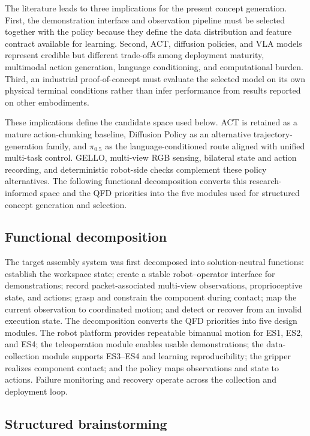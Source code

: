 The literature leads to three implications for the present concept generation. First, the demonstration interface and observation pipeline must be selected together with the policy because they define the data distribution and feature contract available for learning. Second, ACT, diffusion policies, and VLA models represent credible but different trade-offs among deployment maturity, multimodal action generation, language conditioning, and computational burden. Third, an industrial proof-of-concept must evaluate the selected model on its own physical terminal conditions rather than infer performance from results reported on other embodiments.

These implications define the candidate space used below. ACT is retained as a mature action-chunking baseline, Diffusion Policy as an alternative trajectory-generation family, and $\pi_{0.5}$ as the language-conditioned route aligned with unified multi-task control. GELLO, multi-view RGB sensing, bilateral state and action recording, and deterministic robot-side checks complement these policy alternatives. The following functional decomposition converts this research-informed space and the QFD priorities into the five modules used for structured concept generation and selection.


\subsection{Functional decomposition}

The target assembly system was first decomposed into solution-neutral functions: establish the workspace state; create a stable robot--operator interface for demonstrations; record packet-associated multi-view observations, proprioceptive state, and actions; grasp and constrain the component during contact; map the current observation to coordinated motion; and detect or recover from an invalid execution state. The decomposition converts the QFD priorities into five design modules. The robot platform provides repeatable bimanual motion for ES1, ES2, and ES4; the teleoperation module enables usable demonstrations; the data-collection module supports ES3--ES4 and learning reproducibility; the gripper realizes component contact; and the policy maps observations and state to actions. Failure monitoring and recovery operate across the collection and deployment loop.

\subsection{Structured brainstorming}


